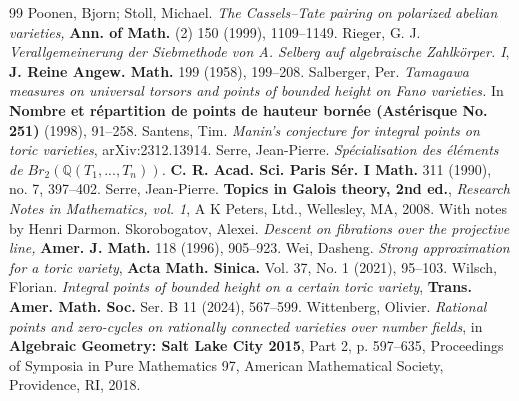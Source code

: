 \documentclass[11pt,letterpaper]{amsart}
\newcommand{\BQ}{{\mathbb {Q}}}
\theoremstyle{plain}
\numberwithin{equation}{section}
\theoremstyle{definition}
\theoremstyle{remark}
\begin{document}
\begin{thebibliography}{99}
	 Poonen, Bjorn; Stoll, Michael. \emph{The Cassels--Tate pairing on polarized abelian varieties,} \textbf{Ann. of Math.} (2) 150 (1999), 1109--1149.
	 Rieger, G. J.  \emph{Verallgemeinerung der Siebmethode von A. Selberg auf algebraische Zahlkörper. I}, \textbf{J. Reine Angew. Math.} 199 (1958), 199--208.
	 Salberger, Per. \emph{Tamagawa measures on universal torsors and points of bounded height on Fano varieties.} In \textbf{Nombre et répartition de points de hauteur bornée (Astérisque No. 251)} (1998), 91--258. 
	 Santens, Tim. \emph{Manin's conjecture for integral points on toric varieties}, arXiv:2312.13914.
	  Serre, Jean-Pierre. \emph{Spécialisation des éléments de $Br_2(\BQ(T_1, . . . , T_n))$.} \textbf{ C. R. Acad. Sci. Paris Sér. I Math.} 311 (1990), no. 7, 397--402.
	 Serre, Jean-Pierre. \textbf{Topics in Galois theory, 2nd ed.}, \emph{Research Notes in Mathematics, vol. 1}, A K Peters, Ltd., Wellesley, MA, 2008. With notes by Henri Darmon.
	 Skorobogatov, Alexei. \emph{Descent on fibrations over the projective line,} \textbf{Amer. J. Math.} 118 (1996), 905--923.
	 Wei, Dasheng. \emph{Strong approximation for a toric variety},  \textbf{Acta Math. Sinica.} Vol. 37, No. 1 (2021), 95--103. 
	 Wilsch, Florian. \emph{Integral points of bounded height on a certain toric variety}, \textbf{Trans. Amer. Math. Soc.} Ser. B 11 (2024), 567--599. 
	 Wittenberg, Olivier. \emph{Rational points and zero-cycles on rationally connected varieties over number fields}, in \textbf{Algebraic Geometry: Salt Lake City 2015}, Part 2, p. 597--635, Proceedings of Symposia in Pure Mathematics 97, American Mathematical Society, Providence, RI, 2018.
\end{thebibliography}
\end{document}
